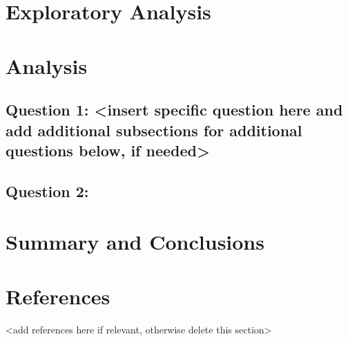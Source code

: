 \documentclass[12pt,]{article}
\begin{document}
\newpage

\hypertarget{exploratory-analysis}{%
\section{Exploratory Analysis}\label{exploratory-analysis}}

\newpage

\hypertarget{analysis}{%
\section{Analysis}\label{analysis}}

\hypertarget{question-1-insert-specific-question-here-and-add-additional-subsections-for-additional-questions-below-if-needed}{%
\subsection{Question 1: \textless{}insert specific question here and add
additional subsections for additional questions below, if
needed\textgreater{}}\label{question-1-insert-specific-question-here-and-add-additional-subsections-for-additional-questions-below-if-needed}}

\hypertarget{question-2}{%
\subsection{Question 2:}\label{question-2}}

\newpage

\hypertarget{summary-and-conclusions}{%
\section{Summary and Conclusions}\label{summary-and-conclusions}}

\newpage

\hypertarget{references}{%
\section{References}\label{references}}

\textless{}add references here if relevant, otherwise delete this
section\textgreater{}
\end{document}
